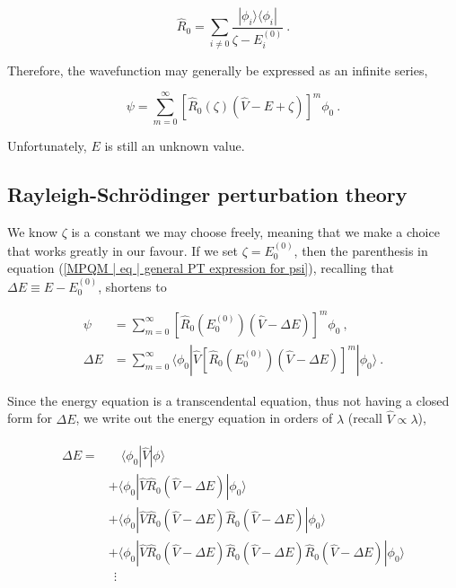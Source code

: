\documentclass[10pt,twoside]{report}
\begin{document}
	\begin{equation}
	\hat{R}_0 = \sum_{i\neq 0} \frac{|\phi_i\rangle\langle\phi_i|}{\zeta-E_i^{(0)}} \:.
	\end{equation}
	
	Therefore, the wavefunction may generally be expressed as an infinite series,
	
	\begin{equation}
		\psi = \sum_{m=0}^\infty \left[ \hat{R}_0(\zeta)(\hat{V} - E + \zeta) \right]^m\phi_0 \:.
		\label{MPQM | eq | general PT expression for psi}
	\end{equation}
	
	Unfortunately, $E$ is still an unknown value.
	
	\subsection{Rayleigh-Schr\"odinger perturbation theory}
	We know $\zeta$ is a constant we may choose freely, meaning that we make a choice that works greatly in our favour. If we set $\zeta=E_0^{(0)}$, then \cite{ShavittBartlett09} the parenthesis in equation (\ref{MPQM | eq | general PT expression for psi}), recalling that $\Delta E \equiv E-E_0^{(0)}$, shortens to
	
	\begin{align}
		\psi &= \sum_{m=0}^\infty \left[ \hat{R}_0(E_0^{(0)})(\hat{V} - \Delta E) \right]^m\phi_0 \:,\\
		\Delta E &= \sum_{m=0}^\infty \langle\phi_0|\hat{V}\left[ \hat{R}_0(E_0^{(0)})(\hat{V} - \Delta E) \right]^m|\phi_0\rangle \:.
	\end{align}
	
	Since the energy equation is a transcendental equation, thus not having a closed form for $\Delta E$, we write out the energy equation in orders of $\lambda$ (recall $\hat{V}\propto\lambda$),
	
	\begin{align}
		\begin{split}
			\Delta E = &\quad\langle\phi_0|\hat{V}|\phi\rangle \\
			&+ \langle\phi_0|\hat{V}\hat{R}_0(\hat{V}-\Delta E)|\phi_0\rangle\\
			&+ \langle\phi_0|\hat{V}\hat{R}_0(\hat{V}-\Delta E)\hat{R}_0(\hat{V}-\Delta E)|\phi_0\rangle\\
			&+ \langle\phi_0|\hat{V}\hat{R}_0(\hat{V}-\Delta E)\hat{R}_0(\hat{V}-\Delta E)\hat{R}_0(\hat{V}-\Delta E)|\phi_0\rangle\\
			&\:\:\vdots
		\end{split}
	\end{align}
	
\end{document}
